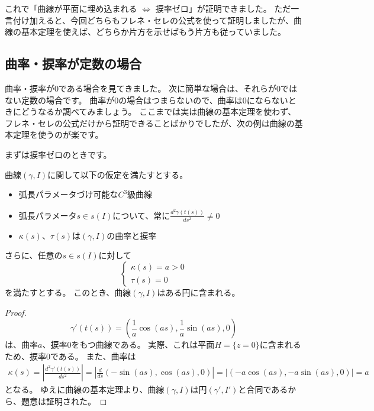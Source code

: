 これで「曲線が平面に埋め込まれる $\iff$ 捩率ゼロ」が証明できました。
ただ一言付け加えると、今回どちらもフレネ・セレの公式を使って証明しましたが、曲線の基本定理を使えば、どちらか片方を示せばもう片方も従っていました。

\subsection{曲率・捩率が定数の場合}

曲率・捩率が0である場合を見てきました。
次に簡単な場合は、それらが0ではない定数の場合です。
曲率が0の場合はつまらないので、曲率は0にならないときにどうなるか調べてみましょう。
ここまでは実は曲線の基本定理を使わず、フレネ・セレの公式だけから証明できることばかりでしたが、次の例は曲線の基本定理を使うのが楽です。

まずは捩率ゼロのときです。
\begin{example}
  曲線$(\gamma,I)$に関して以下の仮定を満たすとする。
  \begin{itemize}
    \item 弧長パラメータづけ可能な$C^3$級曲線
    \item 弧長パラメータ$s\in s(I)$について、常に$\frac{d^2\gamma(t(s))}{ds^2}\neq0$
    \item $\kappa(s)$、$\tau(s)$は$(\gamma,I)$の曲率と捩率
  \end{itemize}
  さらに、任意の$s\in s(I)$に対して
  \[
    \begin{cases}
      \kappa(s)=a>0\\
      \tau(s)=0
    \end{cases}
  \]
  を満たすとする。
  このとき、曲線$(\gamma,I)$はある円に含まれる。
\end{example}
\begin{proof}
  \[
    \gamma'(t(s))=\left(\frac1a\cos(as),\frac1a\sin(as),0\right)
  \]
  は、曲率$a$、捩率0をもつ曲線である。
  実際、これは平面$H=\{z=0\}$に含まれるため、捩率0である。
  また、曲率は
  \begin{align*}
    \kappa(s)=\left|\frac{d^2\gamma'(t(s))}{ds^2}\right|=\left|\frac{d}{ds}(-\sin(as),\cos(as),0)\right|=|(-a\cos(as),-a\sin(as),0)|=a
  \end{align*}
  となる。
  ゆえに曲線の基本定理より、曲線$(\gamma,I)$は円$(\gamma',I')$と合同であるから、題意は証明された。
\end{proof}

